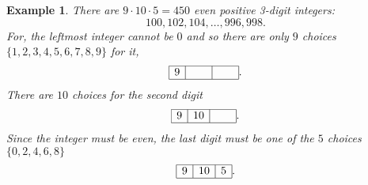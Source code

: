 \documentclass[11pt, openany]{book}
\theoremstyle{change} \theoremheaderfont{\blue\sffamily\bfseries}
\newtheorem{exa}[thm]{Example}
\theoremstyle{nonumberplain} \theoremheaderfont{\sffamily\bfseries}
\newcommand{\í}{\'{\i}}
\begin{document}
\begin{exa}\label{exa:3_digit_integers_even}
There are $9\cdot 10\cdot 5 =450$ even positive 3-digit integers:
$$100, 102, 104, \ldots , 996, 998.        $$
For, the leftmost integer cannot be $0$ and so there are only $9$
choices $\{1,2,3,4,5,6,7,8,9\}$ for it,
$$\begin{array}{|c|c|c|}\hline 9  & \hspace{.5cm} & \hspace{.5cm}  \\ \hline \end{array}.  $$
There are $10$ choices for the second digit
$$\begin{array}{|c|c|c|}\hline 9  & 10 & \hspace{.5cm}  \\ \hline \end{array}.  $$
Since the integer must be even, the last digit must be one of the
$5$ choices $\{0,2,4,6,8\}$
$$\begin{array}{|c|c|c|}\hline 9  & 10 & 5  \\ \hline \end{array}.  $$
\end{exa}
\end{document}

